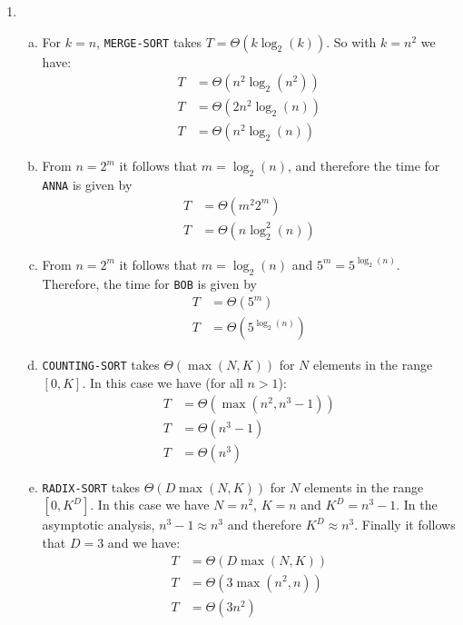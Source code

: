 \documentclass{article}
\begin{document}
\begin{enumerate}[1.]

    \item
    \begin{enumerate}[(a)]
        \item For $k = n$, \texttt{MERGE-SORT} takes $T = \Theta(k\log_2(k))$. So with $k = n^2$ we have:
        \begin{align*}
            T &= \Theta(n^2\log_2(n^2))\\
            T &= \Theta(2n^2\log_2(n)) \\
            T &= \Theta(n^2\log_2(n))
        \end{align*} 
        \item From $n = 2^m$ it follows that $m = \log_2(n)$, and therefore the time for \texttt{ANNA} is given by
        \begin{align*}
            T &= \Theta(m^2 2^m)\\
            T &= \Theta(n \log_2^2(n))
        \end{align*}
        \item From $n = 2^m$ it follows that $m = \log_2(n)$ and $5^m = 5^{\log_2(n)}$. Therefore, the time for \texttt{BOB} is given by
        \begin{align*}
            T &= \Theta(5^m)\\
            T &= \Theta(5^{\log_2(n)})
        \end{align*}
        \item \texttt{COUNTING-SORT} takes $\Theta(\max(N, K))$ for $N$ elements in the range $[0, K]$. In this case we have (for all $n > 1$):
        \begin{align*}
            T &= \Theta(\max(n^2, n^3 -1))\\
            T &= \Theta(n^3 -1) \\
            T &= \Theta(n^3)
        \end{align*}
        \item \texttt{RADIX-SORT} takes $\Theta(D\max(N, K))$ for $N$ elements in the range $[0, K^D]$. In this case we have $N = n^2$, $K = n$ and $K^D = n^3 - 1$. In the asymptotic analysis, $n^3 - 1 \approx n^3$ and therefore $K^D \approx n^3$. Finally it follows that $D = 3$ and we have:
        \begin{align*}
            T &= \Theta(D\max(N, K))\\
            T &= \Theta(3\max(n^2, n)) \\
            T &= \Theta(3n^2)
        \end{align*}
    \end{enumerate}
    

\end{enumerate}
\end{document}
